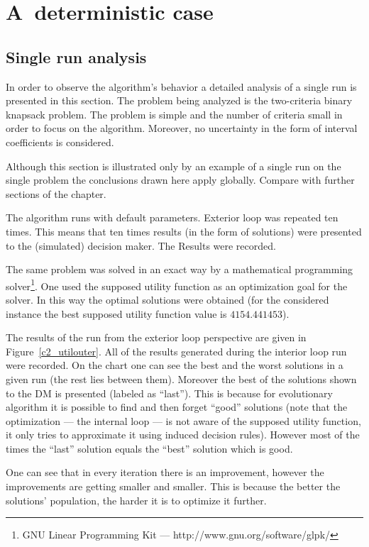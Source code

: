\section{A~deterministic case}
\subsection{Single run analysis}
In order to observe the algorithm's behavior a detailed analysis of a single
run is presented in this section. The problem being analyzed is the
two-criteria binary knapsack problem. The problem is simple and
the number of criteria small in order to focus on the algorithm. Moreover, no
uncertainty in the form of interval coefficients is considered.

Although this section is illustrated only by an example of a single run on the
single problem the conclusions drawn here apply globally. Compare with
further sections of the chapter.

The algorithm runs with default parameters. Exterior loop was repeated ten
times. This means that ten times results (in the form of solutions) were
presented to the (simulated) decision maker. The Results were recorded.

The same problem was solved in an exact way by a mathematical programming
solver\footnote{GNU Linear Programming Kit ---
  http://www.gnu.org/software/glpk/}. One used the supposed utility function
as an optimization goal for the solver. In this way the optimal solutions were
obtained (for the considered instance the best supposed utility function value
is $4154.441453$).

The results of the run from the exterior loop perspective are given in
Figure~\ref{c2_utilouter}. All of the results generated during the interior
loop run were recorded. On the chart one can see the best and the worst
solutions in a given run (the rest lies between them). Moreover the best of
the solutions shown to the DM is presented (labeled as ``last''). This is
because for evolutionary algorithm it is possible to find and then forget
``good'' solutions (note that the optimization --- the internal loop --- is
not aware of the supposed utility function, it only tries to approximate it
using induced decision rules). However most of the times the ``last'' solution
equals the ``best'' solution which is good.

One can see that in every iteration there is an improvement, however the
improvements are getting smaller and smaller. This is because the better the
solutions' population, the harder it is to optimize it further.

